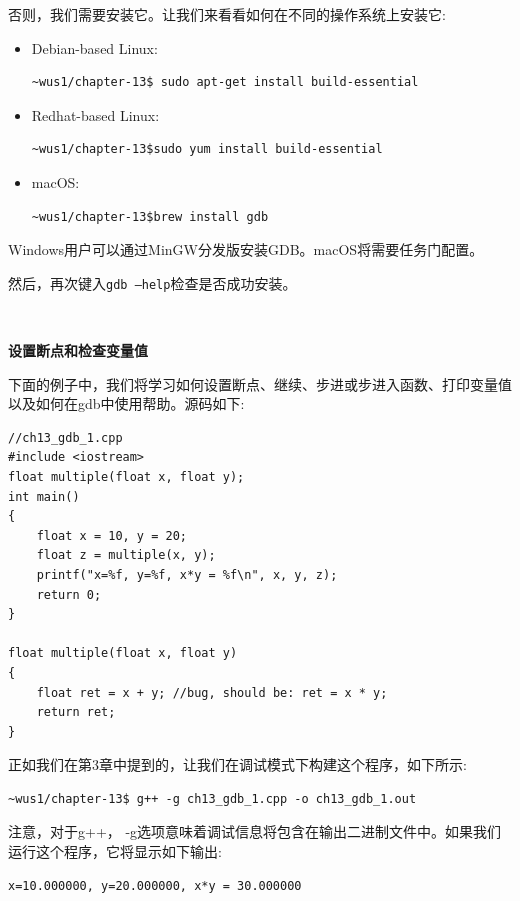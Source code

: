 否则，我们需要安装它。让我们来看看如何在不同的操作系统上安装它: \par

\begin{itemize}
	\item Debian-based Linux:
	\begin{lstlisting}[caption={}]
	~wus1/chapter-13$ sudo apt-get install build-essential
	\end{lstlisting}
	\item Redhat-based Linux:
	\begin{lstlisting}[caption={}]
	~wus1/chapter-13$sudo yum install build-essential
	\end{lstlisting}
	\item macOS:
	\begin{lstlisting}[caption={}]
	~wus1/chapter-13$brew install gdb
	\end{lstlisting}
\end{itemize}

Windows用户可以通过MinGW分发版安装GDB。macOS将需要任务门配置。 \par
然后，再次键入\texttt{gdb --help}检查是否成功安装。 \par

\noindent\textbf{}\ \par
\textbf{设置断点和检查变量值} \ \par
下面的例子中，我们将学习如何设置断点、继续、步进或步进入函数、打印变量值以及如何在gdb中使用帮助。源码如下: \par

\begin{lstlisting}[caption={}]
//ch13_gdb_1.cpp
#include <iostream>
float multiple(float x, float y);
int main()
{
	float x = 10, y = 20;
	float z = multiple(x, y);
	printf("x=%f, y=%f, x*y = %f\n", x, y, z);
	return 0;
}

float multiple(float x, float y)
{
	float ret = x + y; //bug, should be: ret = x * y;
	return ret;
}
\end{lstlisting}

正如我们在第3章中提到的，让我们在调试模式下构建这个程序，如下所示: \par
\begin{lstlisting}[caption={}]
~wus1/chapter-13$ g++ -g ch13_gdb_1.cpp -o ch13_gdb_1.out
\end{lstlisting}

注意，对于g++， -g选项意味着调试信息将包含在输出二进制文件中。如果我们运行这个程序，它将显示如下输出: \par
\begin{lstlisting}[caption={}]
x=10.000000, y=20.000000, x*y = 30.000000
\end{lstlisting}

